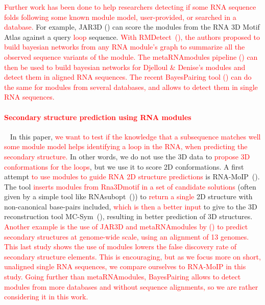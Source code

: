 \documentclass{bioinfo}
\begin{document}
\textcolor{red}{Further work has been done to help researchers detecting if some RNA sequence folds following some known module model, user-provided, or searched in a database.}
For example, JAR3D (\citealp{zirbel_identifying_2015}) can score the modules from the RNA 3D Motif Atlas against a query \textcolor{red}{loop} sequence. 
\textcolor{red}{With RMDetect~(\citealp{cruz2011sequence}), the authors proposed to build bayesian networks from any RNA module's graph to summarize all the observed sequence variants of the module. 
The metaRNAmodules pipeline (\citealp{theis2013automated}) can then be used to build bayesian networks for Djelloul \& Denise's modules and detect them in aligned RNA sequences.  
The recent BayesPairing tool (\citealp{sarrazin2019automated}) can do the same for modules from several databases, and allows to detect them in single RNA sequences.}

\paragraph{\textcolor{red}{Secondary structure prediction using RNA modules}} ~ In this paper, \textcolor{red}{we want to test if the knowledge that a subsequence matches well some module model helps identifying a loop in the RNA, when predicting the secondary structure.} 
In other words, we do not use the 3D data to \textcolor{red}{propose 3D conformations for the loops}, but we use it to score 2D conformations. 
A first attempt \textcolor{red}{to use modules to guide RNA 2D structure predictions} is RNA-MoIP~(\citealp{reinharz_towards_2012}). 
The tool \textcolor{red}{inserts modules from Rna3Dmotif in a set of candidate solutions} (often given by a simple tool like RNAsubopt~(\citealp{lorenz2011viennarna})) to \textcolor{red}{return a single} 2D structure with non-canonical base-pairs included, \textcolor{red}{which is then a better input} to give to the 3D reconstruction tool MC-Sym~(\citealp{parisien2008mc}), resulting in better prediction of 3D structures. 
\textcolor{red}{Another example is the use of JAR3D and metaRNAmodules by (\citealp{theis2015rna}) to predict secondary structures at genome-wide scale, using an alignment of 13 genomes. 
This last study shows the use of modules lowers the false discovery rate of secondary structure elements. 
This is encouraging, but as we focus more on short, unaligned single RNA sequences, we compare ourselves to RNA-MoIP in this study. 
Going further than metaRNAmodules, BayesPairing allows to detect modules from more databases and without sequence alignments, so we are rather considering it in this work.}
\end{document}
